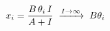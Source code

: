 \documentclass[preview]{standalone}
\begin{document}
\begin{align*}
\special{dvisvgm:raw <g id='unique000'>}x_i = \frac{B\,\theta_i\, I}{A + I}\;\xrightarrow{I\to\infty}\; B\theta_i\special{dvisvgm:raw </g>}
\end{align*}
\end{document}
